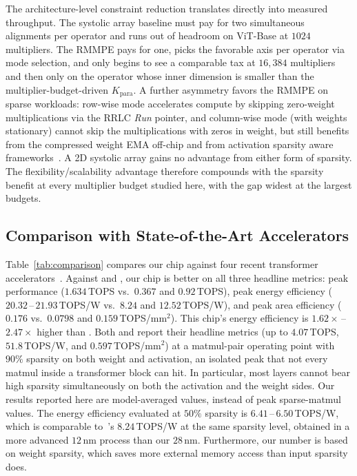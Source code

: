 \documentclass[lettersize,journal]{IEEEtran}
\begin{document}
The architecture-level constraint reduction translates directly into measured throughput. The systolic array baseline must pay for two simultaneous alignments per operator and runs out of headroom on ViT-Base at $1024$ multipliers. The RMMPE pays for one, picks the favorable axis per operator via mode selection, and only begins to see a comparable tax at $16{,}384$ multipliers and then only on the operator whose inner dimension is smaller than the multiplier-budget-driven $K_{\text{para}}$. A further asymmetry favors the RMMPE on sparse workloads: row-wise mode accelerates compute by skipping zero-weight multiplications via the RRLC \textit{Run} pointer, and column-wise mode (with weights stationary) cannot skip the multiplications with zeros in weight, but still benefits from the compressed weight EMA off-chip and from activation sparsity aware frameworks~\cite{Tang2024QUEST}. A 2D systolic array gains no advantage from either form of sparsity. The flexibility/scalability advantage therefore compounds with the sparsity benefit at every multiplier budget studied here, with the gap widest at the largest budgets.

\subsection{Comparison with State-of-the-Art Accelerators}
\label{sec:results-comp}

Table~\ref{tab:comparison} compares our chip against four recent transformer accelerators~\cite{Yang2022isscc, Thierry2023isscc, Li2025SparseTrim, Fan2025MultiTaskTransformer}.
Against \cite{Thierry2023isscc} and \cite{Fan2025MultiTaskTransformer}, %
our chip is better on all three headline metrics: peak performance ($1.634$\,TOPS vs.~$0.367$ and $0.92$\,TOPS), peak energy efficiency ($20.32$\,--\,$21.93$\,TOPS/W vs.~$8.24$ and $12.52$\,TOPS/W), and peak area efficiency ($0.176$ vs.~$0.0798$ and $0.159$\,TOPS/mm$^{2}$). 
This chip's energy efficiency is $1.62\times$\,--\,$2.47\times$ higher than \cite{Thierry2023isscc, Fan2025MultiTaskTransformer}. 
Both \cite{Yang2022isscc} and \cite{Li2025SparseTrim} %
report their headline metrics (up to $4.07$\,TOPS, $51.8$\,TOPS/W, and $0.597$\,TOPS/mm$^{2}$) at a matmul-pair operating point with $90\%$ sparsity on both weight and activation, an isolated peak that not every matmul inside a transformer block can hit. In particular, most layers cannot bear high sparsity simultaneously on both the activation and the weight sides. Our results reported here are model-averaged values, instead of peak sparse-matmul values. The energy efficiency evaluated at $50\%$ sparsity is $6.41$\,--\,$6.50$\,TOPS/W, which is comparable to~\cite{Thierry2023isscc}'s $8.24$\,TOPS/W at the same sparsity level, obtained in a more advanced $12$\,nm process than our $28$\,nm. Furthermore, our number is based on weight sparsity, which saves more external memory access than input sparsity does.
\end{document}
